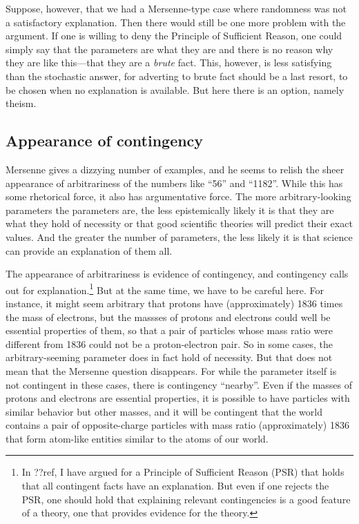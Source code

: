 Suppose, however, that we had a Mersenne-type case where randomness was not a satisfactory explanation. Then there would
still be one more problem with the argument. If one is willing to deny the Principle of Sufficient Reason, one could simply
say that the parameters are what they are and there is no reason why they are like this---that they are a \textit{brute} fact.
This, however, is less satisfying than the stochastic answer, for adverting to brute fact should be a last resort, to be
chosen when no explanation is available. But here there is an option, namely theism.

\subsection{Appearance of contingency}
Mersenne gives a dizzying number of examples, and he seems to relish the sheer appearance of arbitrariness of the numbers like ``56''
and ``1182''. While this has some rhetorical force, it also has argumentative force. The more arbitrary-looking parameters
the parameters are, the less epistemically likely it is that they are what they hold of necessity or that good scientific theories
will predict their exact values. And the greater the number of parameters, the less likely it is that science can provide 
an explanation of them all.

The appearance of arbitrariness is evidence of contingency, and contingency calls out for explanation.\footnote{In ??ref, I have
argued for a Principle of Sufficient Reason (PSR) that holds that all contingent facts have an explanation. But even if one rejects
the PSR, one should hold that explaining relevant contingencies is a good feature of a theory, one that provides evidence for the
theory.} But at the 
same time, we have to be careful here. For instance,
it might seem arbitrary that protons have (approximately) 1836 times the mass of electrons, but the massses of protons and
electrons could well be essential properties of them, so that a pair of particles whose mass ratio were different from 1836 could 
not be a proton-electron pair.  So in some cases, the arbitrary-seeming parameter does in fact hold of necessity. But that does not
mean that the Mersenne question disappears. For while the parameter itself is not contingent in these cases, there is contingency
``nearby''. Even if the masses of protons and electrons are essential properties, it is possible to have particles with similar
behavior but other masses, and it will be contingent that the world contains a pair of opposite-charge particles with mass ratio 
(approximately) 1836 that form atom-like entities similar to the atoms of our world. 

